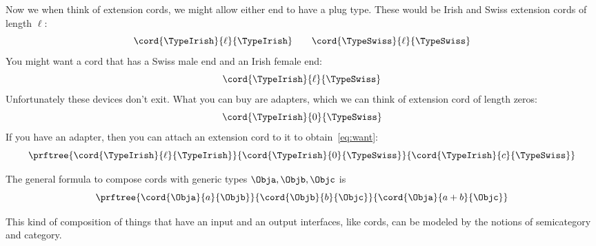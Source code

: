 Now we when think of extension cords, we might allow either end to have a plug type.
%
These would be Irish and Swiss extension cords of length $\ell$:
%
\begin{equation}
    \cord{\TypeIrish}{\ell}{\TypeIrish} \qquad \cord{\TypeSwiss}{\ell}{\TypeSwiss}
\end{equation}
%
You might want a cord that has a Swiss male end and an Irish female end:
%
\begin{equation}
    \label{eq:want}
    \cord{\TypeIrish}{\ell}{\TypeSwiss}
\end{equation}
%
Unfortunately these devices don't exit.
What you can buy are adapters, which we can think of extension cord of length zeros:
\begin{equation}
    \cord{\TypeIrish}{0}{\TypeSwiss}
\end{equation}
%
If you have an adapter, then you can attach an extension cord to it to obtain~\cref{eq:want}:
%
\begin{equation}
    \label{eq:irish-swiss-result}
    \prftree{\cord{\TypeIrish}{\ell}{\TypeIrish}}{\cord{\TypeIrish}{0}{\TypeSwiss}}{\cord{\TypeIrish}{c}{\TypeSwiss}}
\end{equation}

The general formula to compose cords with generic types $\Obja, \Objb, \Objc$ is
\begin{equation}
    \label{eq:cords-generic}
    \prftree{\cord{\Obja}{a}{\Objb}}{\cord{\Objb}{b}{\Objc}}{\cord{\Obja}{a+b}{\Objc}}
\end{equation}

This kind of composition of things that have an input and an output interfaces, like cords, can be modeled by the notions of semicategory and category.


%

%
%
%


